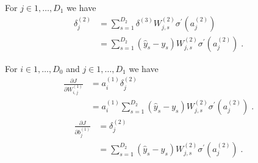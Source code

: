 \documentclass{article}
\begin{document}
For $j \in {1,\dots,D_{1}}$ we have
\begin{align*}
\delta^{(2)}_{j} & = \sum_{s=1}^{D_{2}}\delta^{(3)}W^{(2)}_{j,s} \sigma^{\prime} (a^{(2)}_{j})\\
& = \sum_{s=1}^{D_{2}}(\hat{y}_{s} - y_{s})W^{(2)}_{j,s}\sigma^{\prime} (a^{(2)}_{j})\; .
\end{align*}

For $i \in {1,\dots,D_{0}}$ and $j \in {1,\dots,D_{1}}$ we have
\begin{align*}
\frac{\partial J}{\partial W^{(1)}_{i,j}} & = a^{(1)}_{i}\delta^{(2)}_{j}\\
& = a^{(1)}_{i}\sum_{s=1}^{D_{2}}(\hat{y}_{s} - y_{s})W^{(2)}_{j,s}\sigma^{\prime} (a^{(2)}_{j})\; .
\end{align*}
\begin{align*}
\frac{\partial J}{\partial b^{(1)}_{j}} & = \delta^{(2)}_{j}\\
& = \sum_{s=1}^{D_{2}}(\hat{y}_{s} - y_{s})W^{(2)}_{j,s}\sigma^{\prime} (a^{(2)}_{j})\; .
\end{align*}
\end{document}
